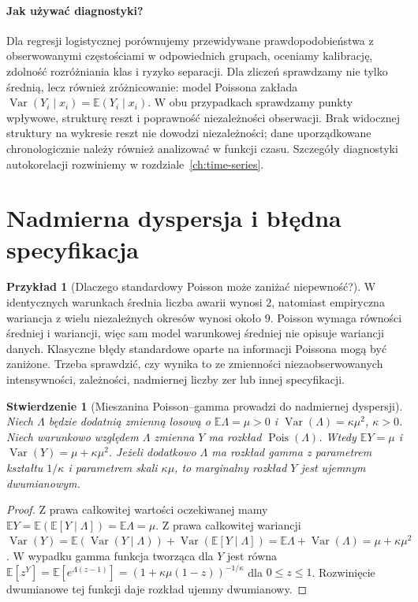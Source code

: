 \documentclass[11pt,a4paper,oneside]{report}
\numberwithin{equation}{chapter}
\theoremstyle{plain}
\newtheorem{stwierdzenie}[twierdzenie]{Stwierdzenie}
\theoremstyle{definition}
\newtheorem{przyklad}{Przykład}[chapter]
\theoremstyle{remark}
\newcommand{\E}{\mathbb E}
\newcommand{\Var}{\operatorname{Var}}
\DeclareMathOperator{\Pois}{Pois}
\begin{document}
\paragraph{Jak używać diagnostyki?}
Dla regresji logistycznej porównujemy przewidywane
prawdopodobieństwa z obserwowanymi częstościami
w odpowiednich grupach, oceniamy kalibrację,
zdolność rozróżniania klas i ryzyko separacji.
Dla zliczeń sprawdzamy nie tylko średnią, lecz również
zróżnicowanie: model Poissona zakłada
$\Var(Y_i\mid x_i)=\E(Y_i\mid x_i)$.
W obu przypadkach sprawdzamy punkty wpływowe,
strukturę reszt i poprawność niezależności obserwacji.
Brak widocznej struktury na wykresie reszt nie dowodzi
niezależności; dane uporządkowane chronologicznie należy
również analizować w funkcji czasu. Szczegóły diagnostyki
autokorelacji rozwiniemy w rozdziale~\ref{ch:time-series}.

\section{Nadmierna dyspersja i błędna specyfikacja}
\begin{przyklad}[Dlaczego standardowy Poisson może zaniżać niepewność?]
W identycznych warunkach średnia liczba awarii
wynosi $2$, natomiast empiryczna wariancja z
wielu niezależnych okresów wynosi około $9$.
Poisson wymaga równości średniej i wariancji,
więc sam model warunkowej średniej nie opisuje
wariancji danych. Klasyczne błędy standardowe
oparte na informacji Poissona mogą być zaniżone.
Trzeba sprawdzić, czy wynika to ze zmienności
niezaobserwowanych intensywności, zależności,
nadmiernej liczby zer lub innej specyfikacji.
\end{przyklad}

\begin{stwierdzenie}[Mieszanina Poisson--gamma prowadzi do nadmiernej dyspersji]
\label{prop:poisson-gamma}
Niech $\Lambda$ będzie dodatnią zmienną losową o
$\E\Lambda=\mu>0$ i $\Var(\Lambda)=\kappa\mu^2$,
$\kappa>0$. Niech warunkowo względem $\Lambda$
zmienna $Y$ ma rozkład $\Pois(\Lambda)$.
Wtedy $\E Y=\mu$ i
$\Var(Y)=\mu+\kappa\mu^2$.
Jeżeli dodatkowo $\Lambda$ ma rozkład gamma z
parametrem kształtu $1/\kappa$ i parametrem skali
$\kappa\mu$, to marginalny rozkład $Y$ jest
ujemnym dwumianowym.
\end{stwierdzenie}
\begin{proof}
Z prawa całkowitej wartości oczekiwanej mamy
$\E Y=\E(\E[Y\mid\Lambda])=\E\Lambda=\mu$.
Z prawa całkowitej wariancji
$\Var(Y)=\E(\Var(Y\mid\Lambda))+
\Var(\E[Y\mid\Lambda])=
\E\Lambda+\Var(\Lambda)=\mu+\kappa\mu^2$.
W wypadku gamma funkcja tworząca dla $Y$ jest równa
$\E[z^Y]=\E[e^{\Lambda(z-1)}]
=(1+\kappa\mu(1-z))^{-1/\kappa}$
dla $0\le z\le1$. Rozwinięcie dwumianowe tej
funkcji daje rozkład ujemny dwumianowy.
\end{proof}
\end{document}
